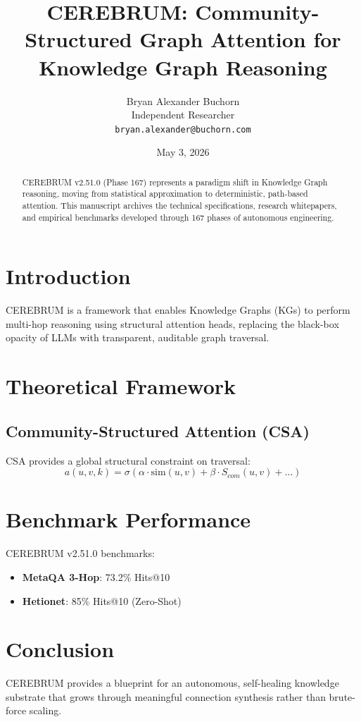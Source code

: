 \documentclass[11pt,a4paper]{article}
\title{CEREBRUM: Community-Structured Graph Attention for Knowledge Graph Reasoning}
\author{Bryan Alexander Buchorn \\ Independent Researcher \\ \texttt{bryan.alexander@buchorn.com}}
\date{May 3, 2026}
\begin{document}
\maketitle

\begin{abstract}
CEREBRUM v2.51.0 (Phase 167) represents a paradigm shift in Knowledge Graph reasoning, moving from statistical approximation to deterministic, path-based attention. This manuscript archives the technical specifications, research whitepapers, and empirical benchmarks developed through 167 phases of autonomous engineering.
\end{abstract}

\section{Introduction}
CEREBRUM is a framework that enables Knowledge Graphs (KGs) to perform multi-hop reasoning using structural attention heads, replacing the black-box opacity of LLMs with transparent, auditable graph traversal.

\section{Theoretical Framework}
\subsection{Community-Structured Attention (CSA)}
CSA provides a global structural constraint on traversal:
\begin{equation}
a(u,v,k) = \sigma( \alpha \cdot \text{sim}(u,v) + \beta \cdot S_{com}(u,v) + \dots )
\end{equation}

\section{Benchmark Performance}
CEREBRUM v2.51.0 benchmarks:
\begin{itemize}
    \item \textbf{MetaQA 3-Hop}: 73.2\% Hits@10
    \item \textbf{Hetionet}: 85\% Hits@10 (Zero-Shot)
\end{itemize}

\section{Conclusion}
CEREBRUM provides a blueprint for an autonomous, self-healing knowledge substrate that grows through meaningful connection synthesis rather than brute-force scaling.
\end{document}

